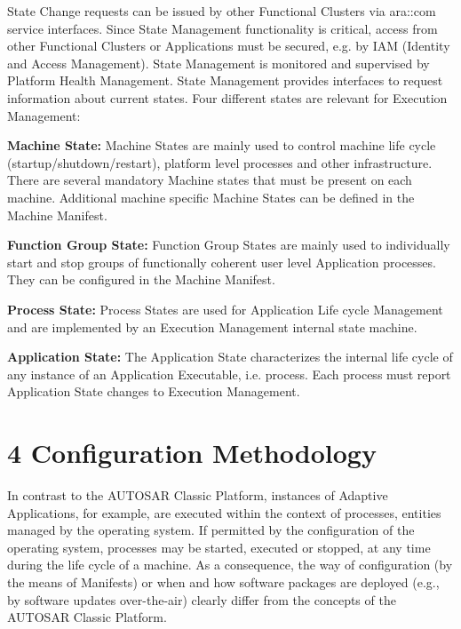 State Change requests can be issued by other Functional Clusters via ara\+::com service interfaces. Since State Management functionality is critical, access from other Functional Clusters or Applications must be secured, e.\+g. by I\+AM (Identity and Access Management). State Management is monitored and supervised by Platform Health Management. State Management provides interfaces to request information about current states.  Four different states are relevant for Execution Management\+:
\begin{DoxyItemize}
\item {\bfseries Machine State\+:} Machine States are mainly used to control machine life cycle (startup/shutdown/restart), platform level processes and other infrastructure. There are several mandatory Machine states that must be present on each machine. Additional machine specific Machine States can be defined in the Machine Manifest.
\item {\bfseries Function Group State\+:} Function Group States are mainly used to individually start and stop groups of functionally coherent user level Application processes. They can be configured in the Machine Manifest.
\item {\bfseries Process State\+:} Process States are used for Application Life cycle Management and are implemented by an Execution Management internal state machine.
\item {\bfseries Application State\+:} The Application State characterizes the internal life cycle of any instance of an Application Executable, i.\+e. process. Each process must report Application State changes to Execution Management.
\end{DoxyItemize}

\section*{4 Configuration Methodology}

In contrast to the A\+U\+T\+O\+S\+AR Classic Platform, instances of Adaptive Applications, for example, are executed within the context of processes, entities managed by the operating system. If permitted by the configuration of the operating system, processes may be started, executed or stopped, at any time during the life cycle of a machine. As a consequence, the way of configuration (by the means of Manifests) or when and how software packages are deployed (e.\+g., by software updates over-\/the-\/air) clearly differ from the concepts of the A\+U\+T\+O\+S\+AR Classic Platform.

